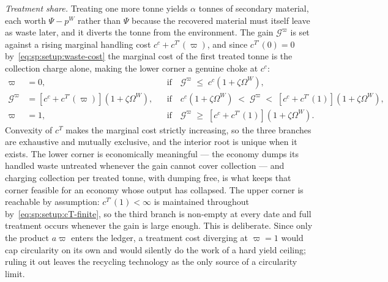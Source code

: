 \emph{Treatment share.} Treating one more tonne yields $\alpha$ tonnes of secondary material, each
worth $\Psi-p^W$ rather than $\Psi$ because the recovered material must itself leave as waste later,
and it diverts the tonne from the environment. The gain $\mathcal G^\varpi$ is set against a rising
marginal handling cost $c^c+c^{T\prime}\left(\varpi\right)$, and since $c^{T\prime}\left(0\right)=0$
by~\eqref{eq:sp:setup:waste-cost} the marginal cost of the first treated tonne is the collection
charge alone, making the lower corner a genuine choke at $c^c$:
\begin{subequations}
\label{eq:sp:sum:varpi}
\begin{align}
\varpi &= 0,
&&\text{if}\quad \mathcal G^{\varpi} \;\le\; c^c\left(1+\zeta\Omega^W\right),
\label{eq:sp:sum:varpi-lower}
\\
\mathcal G^{\varpi} &= \left[c^c+c^{T\prime}\left(\varpi\right)\right]\left(1+\zeta\Omega^W\right),
&&\text{if}\quad c^c\left(1+\zeta\Omega^W\right) \;<\; \mathcal G^{\varpi} \;<\; \left[c^c+c^{T\prime}\left(1\right)\right]\left(1+\zeta\Omega^W\right),
\label{eq:sp:sum:varpi-interior}
\\
\varpi &= 1,
&&\text{if}\quad \mathcal G^{\varpi} \;\ge\; \left[c^c+c^{T\prime}\left(1\right)\right]\left(1+\zeta\Omega^W\right).
\label{eq:sp:sum:varpi-upper}
\end{align}
\end{subequations}
Convexity of $c^T$ makes the marginal cost strictly increasing, so the three branches are exhaustive
and mutually exclusive, and the interior root is unique when it exists. The lower corner is
economically meaningful --- the economy dumps its handled waste untreated whenever the gain cannot
cover collection --- and charging collection per treated tonne, with dumping free, is what keeps that
corner feasible for an economy whose output has collapsed. The upper corner is reachable
by assumption: $c^{T\prime}\left(1\right)<\infty$ is maintained throughout
by~\eqref{eq:sp:setup:cT-finite}, so the third branch is non-empty at every date and full treatment
occurs whenever the gain is large enough. This is deliberate. Since only the product $a\varpi$ enters
the ledger, a treatment cost diverging at $\varpi=1$ would cap circularity on its own and would
silently do the work of a hard yield ceiling; ruling it out leaves the recycling technology as the
only source of a circularity limit.


